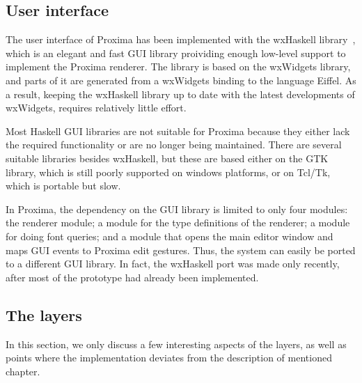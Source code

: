 \subsection{User interface}

The user interface of Proxima has been implemented with the wxHaskell library~\cite{leijen04wxHaskell}, which is  an elegant and fast GUI library proividing enough low-level support to implement the Proxima renderer. The library is based on the wxWidgets library, and parts of it are generated from a wxWidgets binding to the language Eiffel. As a result, keeping the wxHaskell library up to date with the latest developments of wxWidgets, requires relatively little effort. 

Most Haskell GUI libraries are not suitable for Proxima because they either lack the required functionality or are no longer being maintained. There are several suitable libraries besides wxHaskell, but these are based either on the GTK library, which is still poorly supported on windows platforms, or on Tcl/Tk, which is portable but slow.

In Proxima, the dependency on the GUI library is limited to only four modules: the renderer module; a module for the type definitions of the renderer; a module for doing font queries; and a module that opens the main editor window and maps GUI events to Proxima edit gestures. Thus, the system can easily be ported to  a different GUI library. In fact, the wxHaskell port was made only recently, after most of the prototype had already been implemented.



\bc
\subsection{The layers}
\toHere

In this section, we only discuss a few interesting aspects of the layers, as well as points where the implementation deviates from the description of mentioned chapter.

